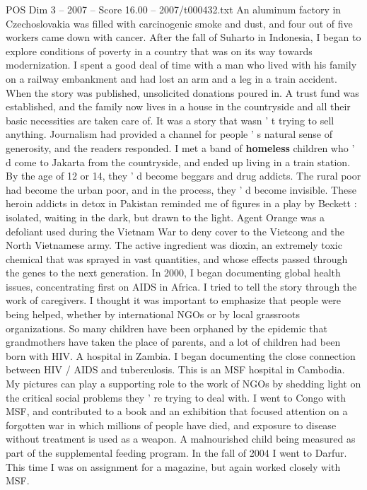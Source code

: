 \begin{textsample}{POS Dim 3 – 2007 – Score 16.00 – 2007/t000432.txt}
An aluminum factory in Czechoslovakia was filled with carcinogenic smoke and dust, and four out of five workers came down with cancer.
After the fall of Suharto in Indonesia, I began to explore conditions of poverty in a country that was on its way towards modernization.
I spent a good deal of time with a man who lived with his family on a railway embankment and had lost an arm and a leg in a train accident.
When the story was published, unsolicited donations poured in.
A trust fund was established, and the family now lives in a house in the countryside and all their basic necessities are taken care of.
It was a story that wasn ' t trying to sell anything.
Journalism had provided a channel for people ' s natural sense of generosity, and the readers responded.
I met a band of \textbf{homeless} children who ' d come to Jakarta from the countryside, and ended up living in a train station.
By the age of 12 or 14, they ' d become beggars and drug addicts.
The rural poor had become the urban poor, and in the process, they ' d become invisible.
These heroin addicts in detox in Pakistan reminded me of figures in a play by Beckett : isolated, waiting in the dark, but drawn to the light.
Agent Orange was a defoliant used during the Vietnam War to deny cover to the Vietcong and the North Vietnamese army.
The active ingredient was dioxin, an extremely toxic chemical that was sprayed in vast quantities, and whose effects passed through the genes to the next generation.
In 2000, I began documenting global health issues, concentrating first on AIDS in Africa.
I tried to tell the story through the work of caregivers.
I thought it was important to emphasize that people were being helped, whether by international NGOs or by local grassroots organizations.
So many children have been orphaned by the epidemic that grandmothers have taken the place of parents, and a lot of children had been born with HIV.
A hospital in Zambia.
I began documenting the close connection between HIV / AIDS and tuberculosis.
This is an MSF hospital in Cambodia.
My pictures can play a supporting role to the work of NGOs by shedding light on the critical social problems they ' re trying to deal with.
I went to Congo with MSF, and contributed to a book and an exhibition that focused attention on a forgotten war in which millions of people have died, and exposure to disease without treatment is used as a weapon.
A malnourished child being measured as part of the supplemental feeding program.
In the fall of 2004 I went to Darfur.
This time I was on assignment for a magazine, but again worked closely with MSF.

\end{textsample}

